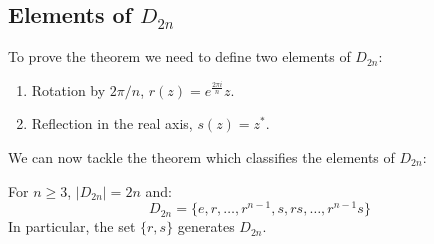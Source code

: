 \documentclass[../main.tex]{subfiles}
\begin{document}
\subsection{Elements of \texorpdfstring{$D_{2n}$}{Dihedral Groups}}
To prove the theorem we need to define two elements of $D_{2n}$:
\begin{enumerate}
 \item Rotation by $2\pi/n$, $r(z) = e^{\frac{2\pi i}{n}}z$.
 \item Reflection in the real axis, $s(z) = z^{*}$.
\end{enumerate}
We can now tackle the theorem which classifies the elements of $D_{2n}$:
\begin{theorem}
  For $n \geq 3$, $|D_{2n}| = 2n$ and:
  \[
    D_{2n} = \{e, r, \ldots, r^{n-1}, s, rs, \ldots, r^{n-1}s\}
  \]
  In particular, the set $\{r, s\}$ generates $D_{2n}$.
\end{theorem}
\end{document}

